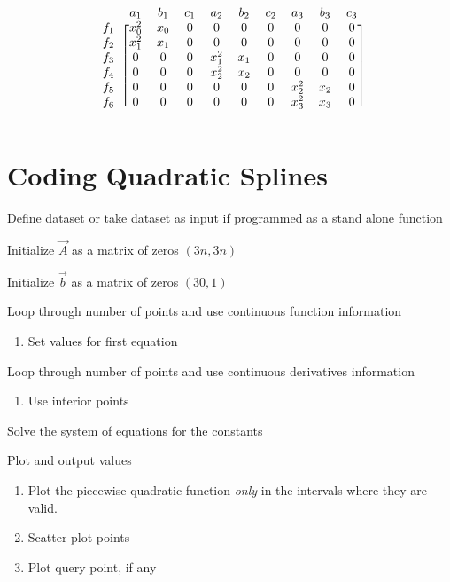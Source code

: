 \begin{equation}
\begin{blockarray}{cccccccccc}
    & a_1 & b_1 & c_1 & a_2 & b_2 & c_2 & a_3 & b_3 & c_3 \\
  \begin{block}{c[ccccccccc]}
	f_1 & x_0^2 & x_0 & 0 & 0 & 0 & 0 & 0 & 0 & 0 \\
	f_2 & x_1^2 & x_1 & 0 & 0 & 0 & 0 & 0 & 0 & 0 \\
	f_3 & 0 & 0 & 0 & x_1^2 & x_1 & 0 & 0 & 0 & 0 \\
	f_4 & 0 & 0 & 0 & x_2^2 & x_2 & 0 & 0 & 0 & 0 \\
	f_5 & 0 & 0 & 0 & 0 & 0 & 0 & x_2^2 & x_2 & 0 \\
	f_6 & 0 & 0 & 0 & 0 & 0 & 0 & x_3^2 & x_3 & 0 \\
  \end{block}
\end{blockarray}
\end{equation}
\renewcommand\arraystretch{1}

\section{Coding Quadratic Splines}


\begin{pseudocode}
\item Define dataset or take dataset as input if programmed as a stand alone function
\item Initialize $\vec{A}$ as a matrix of zeros $(3n,3n)$
\item Initialize $\vec{b}$ as a matrix of zeros $(30,1)$
\item Loop through number of points and use continuous function information

\begin{enumerate}
\item Set values for first equation
\end{enumerate}

\item Loop through number of points and use continuous derivatives information
\begin{enumerate}
\item Use interior points
\end{enumerate}

\item Solve the system of equations for the constants
\item Plot and output values
\begin{enumerate}
	\item Plot the piecewise quadratic function \textit{only} in the intervals where they are valid.
	\item Scatter plot points
	\item Plot query point, if any
\end{enumerate}

\end{pseudocode}